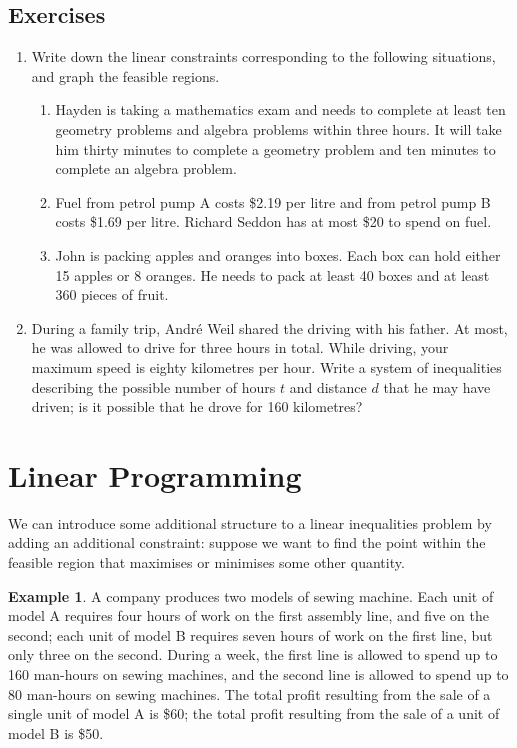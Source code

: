 \documentclass[a4paper,leqno]{article}
\numberwithin{equation}{section}
\theoremstyle{definition}
\newtheorem{ex}[equation]{Example}
\theoremstyle{remark}
\begin{document}
\subsection*{Exercises}
\begin{enumerate}
  \item Write down the linear constraints corresponding to the following situations, and graph the feasible regions.
    \begin{enumerate}
      \item Hayden is taking a mathematics exam and needs to complete at least ten geometry problems and algebra problems within three hours. It
            will take him thirty minutes to complete a geometry problem and ten minutes to complete an algebra problem.
      \item Fuel from petrol pump A costs \$2.19 per litre and from petrol pump B costs \$1.69 per litre. Richard Seddon has at most \$20 to spend on fuel.
      \item John is packing apples and oranges into boxes. Each box can hold either 15 apples or 8 oranges. He needs to pack at least 40 boxes and
            at least 360 pieces of fruit.
    \end{enumerate}
  \item During a family trip, Andr\'e Weil shared the driving with his father. At most, he was allowed to drive for three hours in total. While driving, your
        maximum speed is eighty kilometres per hour. Write a system of inequalities describing the possible number of hours $ t $ and distance $ d $ that
        he may have driven; is it possible that he drove for 160 kilometres?
\end{enumerate}

\section{Linear Programming}
We can introduce some additional structure to a linear inequalities problem by adding an additional constraint: suppose we want to find the point
within the feasible region that maximises or minimises some other quantity.

\begin{ex}
  A company produces two models of sewing machine. Each unit of model A requires four hours of work on the first assembly line, and five on
  the second; each unit of model B requires seven hours of work on the first line, but only three on the second. During a week, the first line
  is allowed to spend up to 160 man-hours on sewing machines, and the second line is allowed to spend up to 80 man-hours on sewing machines. The
  total profit resulting from the sale of a single unit of model A is \$60; the total profit resulting from the sale of a unit of model B is \$50.
\end{ex}
\end{document}
